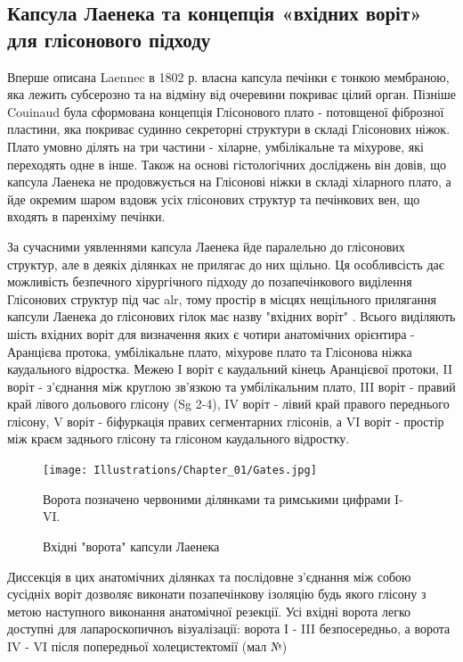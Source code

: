 \begin{refsection}
\subsection{Капсула Лаенека та концепція «вхідних воріт» для глісонового підходу}

Вперше описана Laennec в 1802 р. власна капсула печінки є тонкою мембраною, яка лежить субсерозно та на відміну від очеревини покриває цілий орган. Пізніше Couinaud була сформована концепція Глісонового плато - потовщеної фіброзної пластини, яка покриває судинно секреторні структури в складі Глісонових ніжок. Плато умовно ділять на три частини - хіларне, умбілікальне та міхурове, які переходять одне в інше. Також на основі гістологічних досліджень він довів, що капсула Лаенека не продовжується на Глісонові ніжки в складі хіларного плато, а йде окремим шаром вздовж усіх глісонових структур та печінкових вен, що входять в паренхіму печінки.

За сучасними уявленнями капсула Лаенека йде паралельно до глісонових структур, але в деякіх ділянках не прилягає до них щільно. Ця особливсість дає можливість безпечного хірургічного підходу до позапечінкового виділення Глісонових структур під час \acrshort{alr}, тому простір в місцях нещільного прилягання капсули Лаенека до глісонових гілок має назву "вхідних воріт" \cite{Sugioka2017}. Всього виділяють шість вхідних воріт для визначення яких є чотири анатомічних орієнтира - Аранцієва протока, умбілікальне плато, міхурове плато та Глісонова ніжка каудального відростка. Межею I воріт є каудальний кінець Аранцієвої протоки, II воріт - з'єднання між круглою зв'язкою та умбілікальним плато, III воріт - правий край лівого дольового глісону (Sg 2-4), IV воріт - лівий край правого переднього глісону, V воріт - біфуркація правих сегментарних глісонів, а VI воріт - простір між краєм заднього глісону та глісоном каудального відростку. 

\begin{figure}[h]
\caption{Вхідні "ворота" капсули Лаенека}

\texttt{[image: Illustrations/Chapter\_01/Gates.jpg]}
\label{fig:Gates}

\small
Ворота позначено червоними ділянками та римськими цифрами I-VI.
\end{figure}


Диссекція в цих анатомічних ділянках та послідовне з'єднання між собою сусідніх воріт дозволяє виконати позапечінкову ізоляцію будь якого глісону з метою наступного виконання анатомічної резекції. Усі вхідні ворота легко доступні для лапароскопичноъ візуалізації: ворота I - III безпосередньо, а ворота IV - VI після попередньої холецистектомії (мал №)


\end{refsection}

